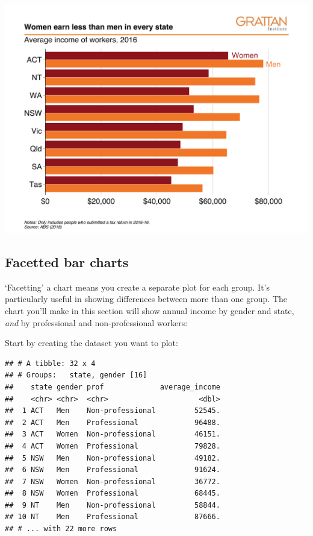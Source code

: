 \documentclass[]{book}
\newenvironment{Shaded}{\begin{snugshade}}{\end{snugshade}}
\newcommand{\DataTypeTok}[1]{\textcolor[rgb]{0.13,0.29,0.53}{#1}}
\newcommand{\KeywordTok}[1]{\textcolor[rgb]{0.13,0.29,0.53}{\textbf{#1}}}
\newcommand{\NormalTok}[1]{#1}
\newcommand{\OperatorTok}[1]{\textcolor[rgb]{0.81,0.36,0.00}{\textbf{#1}}}
\newcommand{\StringTok}[1]{\textcolor[rgb]{0.31,0.60,0.02}{#1}}
\begin{document}
\includegraphics[width=44.44in]{atlas/multiple_bar}

\hypertarget{facet-bar}{%
\subsection{Facetted bar charts}\label{facet-bar}}

`Facetting' a chart means you create a separate plot for each group. It's particularly useful in showing differences between more than one group. The chart you'll make in this section will show annual income by gender and state, \emph{and} by professional and non-professional workers:

Start by creating the dataset you want to plot:

\begin{Shaded}
\end{Shaded}

\begin{verbatim}
## # A tibble: 32 x 4
## # Groups:   state, gender [16]
##    state gender prof             average_income
##    <chr> <chr>  <chr>                     <dbl>
##  1 ACT   Men    Non-professional         52545.
##  2 ACT   Men    Professional             96488.
##  3 ACT   Women  Non-professional         46151.
##  4 ACT   Women  Professional             79828.
##  5 NSW   Men    Non-professional         49182.
##  6 NSW   Men    Professional             91624.
##  7 NSW   Women  Non-professional         36772.
##  8 NSW   Women  Professional             68445.
##  9 NT    Men    Non-professional         58844.
## 10 NT    Men    Professional             87666.
## # ... with 22 more rows
\end{verbatim}
\end{document}

